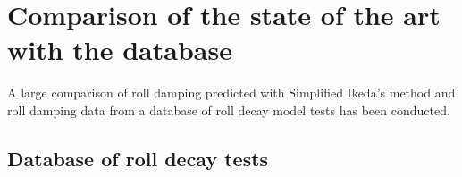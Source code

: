 \section{Comparison of the state of the art with the database}
A large comparison of roll damping predicted with Simplified Ikeda's method and roll damping data from a database of roll decay model tests has been conducted.  

\subsection{Database of roll decay tests}
\label{se:database_of_roll_decay_tests}




